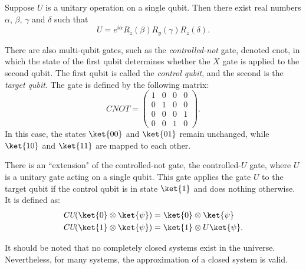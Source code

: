 \begin{theorem} \label{unitary} \cite{nielsen2010quantum}
  Suppose $U$ is a unitary operation on a single qubit. Then there exist real numbers $\alpha$, $\beta$, $\gamma$ and $\delta$ such that
  \begin{equation*}
    U = e^{i\alpha} R_{z}(\beta) R_{y}(\gamma) R_{z}(\delta).
  \end{equation*}
\end{theorem}

\begin{example}
  
There are also multi-qubit gates, such as the \emph{controlled-not} gate, denoted \gls{cnot}, in which the state of the first qubit determines whether the \( X \) gate is applied to the second qubit. The first qubit is called the \emph{control qubit}, and the second is the \emph{target qubit}. The gate is defined by the following matrix:
\begin{equation*}
  \textit{CNOT} = \begin{pmatrix}
    1 & 0 & 0 & 0 \\
    0 & 1 & 0 & 0 \\
    0 & 0 & 0 & 1 \\
    0 & 0 & 1 & 0
  \end{pmatrix}.
\end{equation*}
In this case, the states \( \ket{00} \) and \( \ket{01} \) remain unchanged, while \( \ket{10} \) and \( \ket{11} \) are mapped to each other.

There is an ``extension" of the controlled-not gate, the controlled-$U$ gate, where $U$ is a unitary gate acting on a single qubit. This gate applies the gate $U$ to the target qubit if the control qubit is in state $\ket{1}$ and does nothing otherwise. It is defined as:
\begin{align*}
  &\textit{CU} (\ket{0} \otimes \ket{\psi}) = \ket{0} \otimes \ket{\psi}\\ 
  &\textit{CU} (\ket{1} \otimes \ket{\psi}) = \ket{1} \otimes U\ket{\psi}.
\end{align*}
\end{example}

It should be noted that no completely closed systems exist in the universe. Nevertheless, for many systems, the approximation of a closed system is valid.



